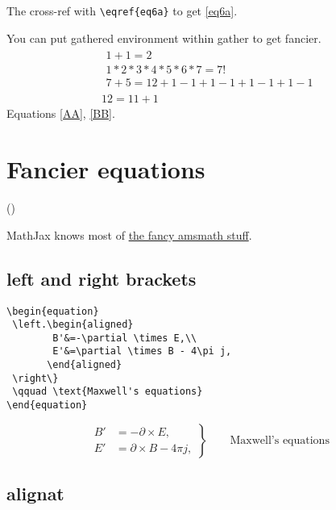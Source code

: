 \documentclass[
  letterpaper,
  DIV=11,
  numbers=noendperiod]{scrreprt}
\begin{document}
The cross-ref with \texttt{\textbackslash{}eqref\{eq6a\}} to get
\eqref{eq6a}.

You can put gathered environment within gather to get fancier.
\begin{gather}
  {\begin{gathered}
   1 + 1 = 2\\
   1 * 2 * 3 * 4 * 5 * 6 * 7 = 7!\\
   7 + 5 = 12+1-1+1-1+1-1+1-1
  \end{gathered}} \label{AA} \\
     12 = 11 + 1 \label{BB}
\end{gather} Equations \eqref{AA}, \eqref{BB}.


\chapter{Fancier equations}\label{fancier-equations}

{(\nextSection)}

MathJax knows most of
\href{https://en.wikibooks.org/wiki/LaTeX/Advanced_Mathematics}{the
fancy amsmath stuff}.

\section{left and right brackets}\label{left-and-right-brackets}

\begin{verbatim}
\begin{equation}
 \left.\begin{aligned}
        B'&=-\partial \times E,\\
        E'&=\partial \times B - 4\pi j,
       \end{aligned}
 \right\}
 \qquad \text{Maxwell's equations}
\end{equation}
\end{verbatim}

\begin{equation}
 \left.\begin{aligned}
        B'&=-\partial \times E,\\
        E'&=\partial \times B - 4\pi j,
       \end{aligned}
 \right\}
 \qquad \text{Maxwell's equations}
\end{equation}

\section{alignat}\label{alignat}
\end{document}
